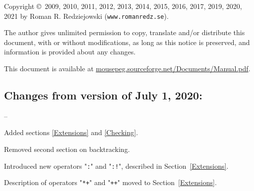 \documentclass[a4paper,fleqn]{article}
\newcommand{\tx}[1]{\texttt{#1}}
\newcommand{\ul}
{\begin{list}
{--}
 {\setlength{\topsep}{0.5ex}
  \setlength{\itemsep}{0ex}
  \setlength{\parsep}{0ex}
  \setlength{\itemindent}{0em}
  \setlength{\labelwidth}{1em}
  \setlength{\labelsep}{0.5em}
  \setlength{\leftmargin}{1.5em}
 }
}
\newcommand{\eul}{\end{list}}
\begin{document}
\noindent
Copyright \copyright\ 2009, 2010, 2011, 2012, 2013, 2014, 2015, 2016, 2017, 2019, 2020, 2021
\newline
by Roman R. Redziejowski (\tx{www.romanredz.se}).

\noindent
The author gives unlimited permission to copy, translate and/or distribute
this document, with or without modifications, 
as long as this notice is preserved,
and information is provided about any changes.

\noindent
This document is available at \url{mousepeg.sourceforge.net/Documents/Manual.pdf}.
\newpage
\tableofcontents

\newpage
{}
\subsection*{Changes from version of July 1, 2020:}
\ul
\item Added sections \ref{Extensions} and \ref{Checking}.
\item Removed second section on backtracking.
\item Introduced new operators "\tx{:}" and "\tx{:!}", described in Section~\ref{Extensions}.
\item Description of operators "\tx{*+}" and "\tx{++}" moved to Section~\ref{Extensions}.
\eul

\newpage
\pagestyle{plain}
\setcounter{page}{1}












\end{document}
